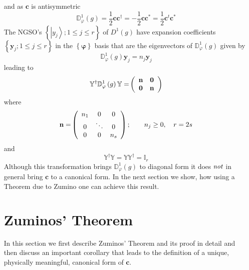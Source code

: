 \documentclass[aps,preprint]{revtex4}%
\begin{document}
and as $\mathbf{c}$ is antisymmetric
\begin{equation}
\mathbb{D}_{\varphi}^{1}\left(  g\right)  =\frac{1}{2}\mathbf{cc}^{\dagger
}=-\frac{1}{2}\mathbf{cc}^{\ast}=\frac{1}{2}\mathbf{c}^{t}\mathbf{c}^{\ast}%
\end{equation}
The NGSO's $\left\{  \left\vert y_{j}\right\rangle ;1\leq j\leq r\right\}  $
of $D^{1}\left(  g\right)  $ have expansion coefficients $\left\{
\mathbf{y}_{j};1\leq j\leq r\right\}  $ in the $\left\{  \mathbf{\varphi
}\right\}  $ basis that are the eigenvectors of $\mathbb{D}_{\varphi}%
^{1}\left(  g\right)  $ given by
\begin{equation}
\mathbb{D}_{\varphi}^{1}\left(  g\right)  \mathbf{y}_{j}=n_{j}\mathbf{y}_{j}%
\end{equation}
leading to
\begin{equation}
\mathbb{Y}^{\dagger}\mathbb{D}_{\varphi}^{1}\left(  g\right)  \mathbb{Y=}%
\left(
\begin{array}
[c]{cc}%
\mathbf{n} & \mathbf{0}\\
\mathbf{0} & \mathbf{n}%
\end{array}
\right)
\end{equation}
where
\begin{equation}
\mathbf{n=}\left(
\begin{array}
[c]{ccc}%
n_{1} & 0 & 0\\
0 & \ddots & 0\\
0 & 0 & n_{s}%
\end{array}
\right)  ;\qquad n_{j}\geq0,\quad r=2s
\end{equation}
and
\begin{equation}
\mathbb{Y}^{\dagger}\mathbb{Y}=\mathbb{YY}^{\dagger}=\mathbb{I}_{r}%
\end{equation}
Although this transformation brings $\mathbb{D}_{\varphi}^{1}\left(  g\right)
$ to diagonal form it does $\emph{not}$ in general bring $\mathbf{c}$ to a
canonical form. In the next section we show, how using a Theorem due to Zumino
\cite{Zumino62} one can achieve this result.

\section{Zuminos' Theorem\label{zumino}}

In this section we first describe Zuminos' Theorem and its proof in detail and
then discuss an important corollary that leads to the definition of a unique,
physically meaningful, canonical form of $\mathbf{c.}$
\end{document}
